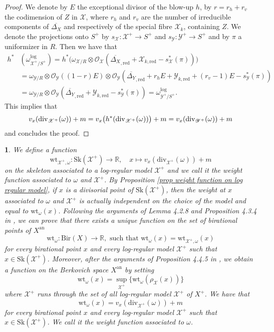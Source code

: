 \documentclass{amsart}%
\numberwithin{equation}{subsection}
\theoremstyle{plain2}
\theoremstyle{definition2}
\theoremstyle{stepstyle}
\theoremstyle{point}
\theoremstyle{subpoint}
\newtheorem{subpoint}[equation]{}%
\newcommand{\spa}[1]{\begin{subpoint}#1\end{subpoint}}           %
\newcommand{\R}{\ensuremath{\mathbb{R}}}
\newcommand{\cX}{\ensuremath{\mathscr{X}}}
\newcommand{\caO}{\ensuremath{\mathcal{O}}}
\newcommand{\cY}{\ensuremath{\mathscr{Y}}}
\renewcommand{\R}{\ensuremath{\mathbb{R}}}
\renewcommand{\cY}{\ensuremath{\mathscr{Y}}}
\newcommand{\redu}{\mathrm{red}}
\newcommand{\an}{\mathrm{an}}
\newcommand{\divisor}{\mathrm{div}}
\newcommand{\weight}{\mathrm{wt}}
\newcommand{\Sk}{\mathrm{Sk}}
\begin{document}
{\begin{proof}
We denote by $E$ the exceptional divisor of the blow-up $h$, by $r=r_h +r_v$ the codimension of $Z$ in $\cX$, where $r_h$ and $r_v$ are the number of irreducible components of $\overline{\Delta_X}$ and respectively of the special fibre $\cX_k$, containing $Z$. We denote the projections onto $S^+$ by $s_{\cX}:\cX^+\rightarrow S^+$ and $s_{\cY}:\cY^+ \rightarrow S^+$ and by $\pi$ a uniformizer in $R$. Then we have that
\begin{align*}
h^*&(\omega^{\log}_{\cX^+/S^+}) = h^* \big(\omega_{\cX/R} \otimes \caO_{\cX}(\overline{\Delta_X}_{,\redu} + \cX_{k,\redu} - s_\cX^*(\pi)) \big) \\
& = \omega_{\cY/R}\otimes \caO_{\cY}((1-r)E) \otimes \caO_{\cY}(\overline{\Delta_Y}_{,\redu} + r_hE+ \cY_{k,\redu} + (r_v-1)E - s_\cY^*(\pi))\\
& = \omega_{\cY/R} \otimes \caO_{\cY}(\overline{\Delta_Y}_{,\redu} + \cY_{k,\redu} - s_\cY^*(\pi)) = \omega^{\log}_{\cY^+/S^+}.
\end{align*} This implies that
$$v_x(\divisor_{\cX^+}(\omega)) +m = v_x\big(h^*(\divisor_{\cX^+}(\omega))\big) + m \\= v_x(\divisor_{\cY^+}(\omega)) +m$$ and concludes the proof.
\end{proof}
}

\spa{We define a function $$\weight_{\cX^+,\omega}: \Sk(\cX^+) \rightarrow \R, \quad x \mapsto v_x(\divisor_{\cX^+}(\omega)) +m$$ on the skeleton associated to a log-regular model $\cX^+$ and we call it the weight function associated to $\omega$ and $\cX^+$. By Proposition \ref{prop weight function on log regular model}, if $x$ is a divisorial point of $\Sk(\cX^+)$, then the weight at $x$ associated to $\omega$ and $\cX^+$ is actually independent on the choice of the model and equal to $\weight_{\omega}(x)$. Following the arguments of Lemma 4.2.8 and Proposition 4.3.4 in \cite{MustataNicaise}, we can prove that there exists a unique function on the set of birational points of $X^\an$ $$\weight_{\omega}: \text{Bir}(X) \rightarrow \R, \text{ such that }\weight_{\omega}(x)= \weight_{\cX^+,\omega}(x)$$ for every birational point $x$ and every log-regular model $\cX^+$ such that $x \in \Sk(\cX^+)$. Moreover, after the arguments of Proposition 4.4.5 in \cite{MustataNicaise}, we obtain a function on the Berkovich space $X^\an$ by setting $$\weight_{\omega}(x) = \sup_{\cX^+} \{ \weight_{\omega}(\rho_\cX (x))\}$$ where $\cX^+$ runs through the set of all log-regular model $\cX^+$ of $X^+$. We have that \begin{equation} \label{equ:weight function formula} \weight_{\omega}(x)=v_x(\divisor_{\cX^+}(\omega)) +m
\end{equation}for every birational point $x$ and every log-regular model $\cX^+$ such that $x \in \Sk(\cX^+)$. We call it the weight function associated to $\omega$.}
\end{document}
